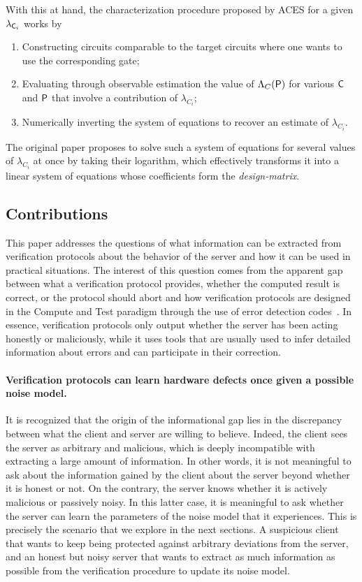 With this at hand, the characterization procedure proposed by ACES for a given $\lambda_{\mathsf{C}_i}$ works by
\begin{enumerate}
\item Constructing circuits comparable to the target circuits where one wants to use the corresponding gate;
\item Evaluating through observable estimation the value of \(\Lambda_{C}(\mathsf{P})\) for various $\mathsf{C}$ and $\mathsf{P}$ that involve a contribution of \(\lambda_{C_i}\);
\item Numerically inverting the system of equations to recover an estimate of $\lambda_{C_i}$. 
\end{enumerate}
The original paper \cite{Flammia2021AverageCircuitEigenvalueSampling} proposes to solve such a system of equations for several values of $\lambda_{C_i}$ at once by taking their logarithm, which effectively transforms it into a linear system of equations whose coefficients form the \emph{design-matrix}. 

\subsection{Contributions}
This paper addresses the questions of what information can be extracted from verification protocols about the behavior of the server and how it can be used in practical situations. The interest of this question comes from the apparent gap between what a verification protocol provides, whether the computed result is correct, or the protocol should abort and how verification protocols are designed in the Compute and Test paradigm through the use of error detection codes~\cite{KKLM22unifying}. In essence, verification protocols only output whether the server has been acting honestly or maliciously, while it uses tools that are usually used to infer detailed information about errors and can participate in their correction.

\paragraph{Verification protocols can learn hardware defects once given a possible noise model.}
It is recognized that the origin of the informational gap lies in the discrepancy between what the client and server are willing to believe. Indeed, the client sees the server as arbitrary and malicious, which is deeply incompatible with extracting a large amount of information. In other words, it is not meaningful to ask about the information gained by the client about the server beyond whether it is honest or not. On the contrary, the server knows whether it is actively malicious or passively noisy. In this latter case, it is meaningful to ask whether the server can learn the parameters of the noise model that it experiences. This is precisely the scenario that we explore in the next sections. A suspicious client that wants to keep being protected against arbitrary deviations from the server, and an honest but noisy server that wants to extract as much information as possible from the verification procedure to update its noise model.


